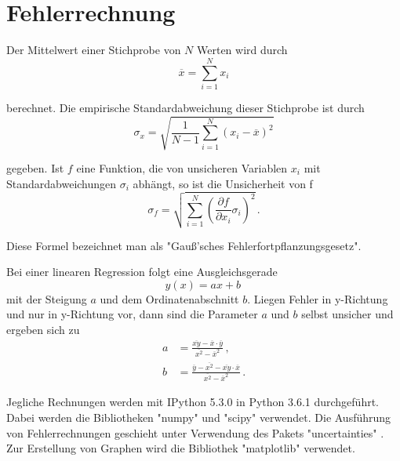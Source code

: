 \section{Fehlerrechnung}
\label{sec:Fehlerrechnung}
Der Mittelwert einer Stichprobe von $N$ Werten wird durch
\begin{equation}
  \overline{x} = \sum\limits_{i = 1}^N x_i
  \label{eqn:mean}
\end{equation}

berechnet.
Die empirische Standardabweichung dieser Stichprobe ist durch
\begin{equation}
  \sigma_x = \sqrt{\frac{1}{N-1}
    \sum\limits_{i = 1}^N
    (x_i-\overline{x})^2}
    \label{eqn:std}
\end{equation}

gegeben.
Ist $f$ eine Funktion, die von unsicheren Variablen $x_i$ mit
Standardabweichungen $\sigma_i$ abhängt, so ist die Unsicherheit von f
\begin{equation}
  \sigma_f = \sqrt{
    \sum\limits_{i = 1}^N
      \left( \frac{\partial f}{\partial x_i} \sigma_i \right)^{\!\! 2}
  }\,.
  \label{eqn:gaussfehler}
\end{equation}

Diese Formel bezeichnet man als "Gauß'sches Fehlerfortpflanzungsgesetz".

Bei einer linearen Regression folgt eine Ausgleichsgerade
\begin{equation}
  y(x) = ax+b\,
\end{equation}
mit der Steigung $a$ und dem Ordinatenabschnitt $b$. Liegen Fehler in y-Richtung
und nur in y-Richtung vor, dann sind die Parameter $a$ und $b$ selbst unsicher
und ergeben sich zu
\begin{align}
  a &= \frac{\overline{xy}-\overline{x} \cdot \overline{y}}{\overline{x^2}-\overline{x}^2}\,,\\
  b &= \frac{\overline{y}-\overline{x^2}-\overline{xy} \cdot \overline{x}}{\overline{x^2}-\overline{x}^2}\,.
\end{align}

Jegliche Rechnungen werden mit IPython 5.3.0 in Python 3.6.1 durchgeführt. Dabei
werden die Bibliotheken "numpy" \cite{numpy} und "scipy" \cite{scipy} verwendet.
Die Ausführung von Fehlerrechnungen geschieht unter Verwendung des Pakets
"uncertainties" \cite{uncertainties}. Zur Erstellung von Graphen wird die Bibliothek
"matplotlib" \cite{matplotlib} verwendet.
